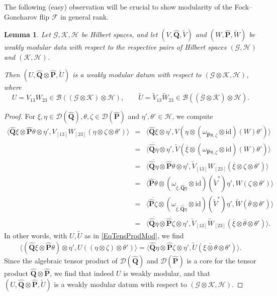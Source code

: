 \documentclass[11pt, reqno]{amsart}
\newtheorem{lemma}[theorem]{Lemma}
\theoremstyle{definition}
\numberwithin{equation}{section}
\def\msD{\mathscr D}
\def\Gc{\mathcal G}
\def\Hc{\mathcal H}
\newcommand{\Bc}{\mathcal{B}}
\newcommand{\Qb}{\mathbf{Q}}
\newcommand{\Pb}{\mathbf{P}}
\newcommand{\Kc}{\mathcal{K}}
\newcommand{\Fct}{\mathcal{F}}
\newcommand{\id}{\mathrm{id}}
\newcommand{\wU}{\widetilde{U}}
\newcommand{\wW}{\widetilde{W}}
\newcommand{\wV}{\widetilde{V}}
\begin{document}
The following  (easy) observation will be crucial to show modularity of the Fock--Goncharov flip $\Fct$ in general rank. 

\begin{lemma}\label{LemMod}
Let $\Gc,\Kc,\Hc$ be Hilbert spaces, and let $(V,\hat{\Qb},\wV)$ and $(W,\hat{\Pb},\wW)$ be weakly modular data with respect to the respective pairs of Hilbert spaces $(\Gc,\Hc)$ and $(\Kc,\Hc)$. 

Then $(U,\hat{\Qb}\otimes \hat{\Pb},\wU)$ is a weakly modular datum with respect to $(\Gc\otimes \Kc,\Hc)$, where 
\begin{equation}\label{EqTensProdMod}
U = V_{13}W_{23} \in \Bc((\Gc\otimes \Kc)\otimes \Hc),\qquad \wU = \wV_{13}\wW_{23} \in \Bc((\overline{\Gc}\otimes \overline{\Kc})\otimes \Hc).
\end{equation}
\end{lemma}
\begin{proof}
For $\xi,\eta\in \msD(\hat{\Qb}),\theta,\zeta\in \msD(\hat{\Pb})$ and $\eta',\theta'\in \Hc$, we compute 
\begin{eqnarray*}
\langle \hat{\Qb}\xi\otimes \hat{\Pb}\theta\otimes \eta',V_{[13]}W_{[23]}(\eta\otimes \zeta\otimes\theta')\rangle &=& \langle \hat{\Qb}\xi\otimes \eta',V(\eta\otimes (\omega_{\hat{\Pb}\theta,\zeta}\otimes \id)(W)\theta')\rangle \\
&=& \langle \overline{\hat{\Qb}\eta}\otimes \eta',\wV(\overline{\xi}\otimes (\omega_{\hat{\Pb}\theta,\zeta}\otimes \id)(W)\theta')\rangle \\
&=& \langle \overline{\hat{\Qb}\eta} \otimes \hat{\Pb}\theta\otimes \eta',\wV_{[13]}W_{[23]}(\overline{\xi}\otimes \zeta\otimes \theta')\rangle \\
&=& \langle \hat{\Pb}\theta\otimes (\omega_{\overline{\xi},\overline{\hat{\Qb}\eta}}\otimes \id)(\wV^*)\eta',W(\zeta\otimes \theta')\rangle \\
&=& \langle \overline{\hat{\Pb}\zeta}\otimes (\omega_{\overline{\xi},\overline{\hat{\Qb}\eta}}\otimes \id)(\wV^*)\eta',\wW(\overline{\theta}\otimes \theta')\rangle \\
&=& \langle \overline{\hat{\Qb}\eta}\otimes \overline{\hat{\Pb}\zeta}\otimes \eta',\wV_{[13]}\wW_{[23]}(\overline{\xi}\otimes \overline{\theta}\otimes \theta')\rangle. 
\end{eqnarray*}
In other words, with $U,\wU$ as in \eqref{EqTensProdMod}, we find 
\[
\langle (\hat{\Qb}\xi\otimes \hat{\Pb}\theta)\otimes \eta',U((\eta\otimes \zeta)\otimes \theta')\rangle = \langle \overline{\hat{\Qb}\eta\otimes \hat{\Pb}\zeta}\otimes \eta',\wU(\overline{\xi\otimes \theta}\otimes \theta')\rangle. 
\]
Since the algebraic tensor product of $\msD(\hat{\Qb})$ and $\msD(\hat{\Pb})$ is a core for the tensor product $\hat{\Qb}\otimes \hat{\Pb}$,  we find that indeed $U$ is weakly modular, and that $(U,\hat{\Qb}\otimes \hat{\Pb},\wU)$ is a weakly modular datum with respect to $(\Gc\otimes \Kc,\Hc)$. 
\end{proof}
\end{document}
